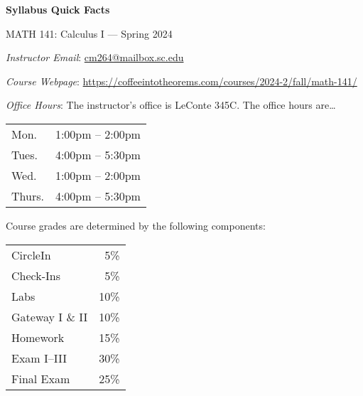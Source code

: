 \documentclass[11pt,letterpaper]{article}
\begin{document}
\begin{center} 
\bfseries
\color{stacred}
\LARGE Syllabus Quick Facts \par\vspace{0.2\baselineskip}
\Large MATH 141: Calculus I --- Spring 2024
\end{center} \pspace


\hspace{0.53cm} {\itshape Instructor Email}: \href{mailto:cm264@mailbox.sc.edu}{cm264@mailbox.sc.edu} \par
\hspace{0.53cm} {\itshape Course Webpage}: \href{https://coffeeintotheorems.com/courses/2024-2/fall/math-141/}{https://coffeeintotheorems.com/courses/2024-2/fall/math-141/} \par
\hspace{0.53cm} {\itshape Office Hours}: The instructor's office is LeConte 345C. The office hours are\dots \par \vspace{-0.3cm}
	\begin{table}[!ht]
	\centering
	\begin{tabular}{l || l}
	Mon. & 1:00pm -- 2:00pm \\
	Tues. & 4:00pm -- 5:30pm \\
	Wed. & 1:00pm -- 2:00pm \\
	Thurs. & 4:00pm -- 5:30pm 
	\end{tabular}
	\end{table} \vspace{-0.3cm}


Course grades are determined by the following components: \par \vspace{-0.3cm}
	\begin{table}[!ht]
        \begin{tabular}{lr}
	CircleIn & 5\% \\
	Check-Ins & 5\% \\
	Labs & 10\% \\
	Gateway I \& II & 10\% \\
	Homework & 15\% \\
	Exam I--III & 30\% \\
	Final Exam & 25\%
        \end{tabular} 
        \end{table}
\end{document}
